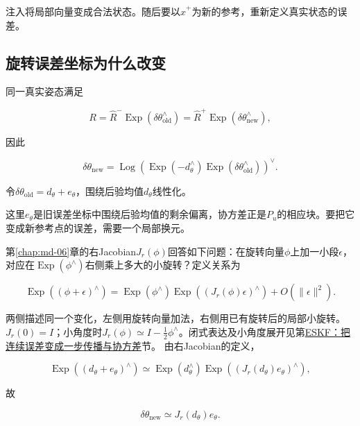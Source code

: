 注入将局部向量变成合法状态。随后要以$\hat x^+$为新的参考，重新定义真实状态的误差。

\subsection{旋转误差坐标为什么改变}

同一真实姿态满足

\begin{equation*}
R=\hat R^-\mathop{\mathrm{Exp}}(\delta\theta_{\mathrm{old}}^\wedge)
  =\hat R^+\mathop{\mathrm{Exp}}(\delta\theta_{\mathrm{new}}^\wedge),
\end{equation*}

因此

\begin{equation*}
\delta\theta_{\mathrm{new}}
 =\mathop{\mathrm{Log}}\left(\mathop{\mathrm{Exp}}(-d_\theta^\wedge)
            \mathop{\mathrm{Exp}}(\delta\theta_{\mathrm{old}}^\wedge)\right)^\vee.
\end{equation*}

令$\delta\theta_{\mathrm{old}}=d_\theta+e_\theta$，围绕后验均值$d_\theta$线性化。

这里$e_\theta$是旧误差坐标中围绕后验均值的剩余偏离，协方差正是$P_u$的相应块。要把它变成新参考点的误差，需要一个局部换元。

第\ref{chap:md-06}章的右Jacobian$J_r(\phi)$回答如下问题：在旋转向量$\phi$上加一小段$\epsilon$，对应在$\mathop{\mathrm{Exp}}(\phi^\wedge)$右侧乘上多大的小旋转？定义关系为

\begin{equation*}
\mathop{\mathrm{Exp}}((\phi+\epsilon)^\wedge)
 =\mathop{\mathrm{Exp}}(\phi^\wedge)\mathop{\mathrm{Exp}}((J_r(\phi)\epsilon)^\wedge)
   +O(\|\epsilon\|^2).
\end{equation*}

两侧描述同一个变化，左侧用旋转向量加法，右侧用已有旋转后的局部小旋转。$J_r(0)=I$；小角度时$J_r(\phi)\simeq I-\tfrac12\phi^\wedge$。闭式表达及小角度展开见第\hyperref[chap:md-09]{ESKF：把连续误差变成一步传播与协方差}节。 由右Jacobian的定义，

\begin{equation*}
\mathop{\mathrm{Exp}}((d_\theta+e_\theta)^\wedge)
 \simeq\mathop{\mathrm{Exp}}(d_\theta^\wedge)
        \mathop{\mathrm{Exp}}((J_r(d_\theta)e_\theta)^\wedge),
\end{equation*}

故

\begin{equation*}
\boxed{\delta\theta_{\mathrm{new}}\simeq J_r(d_\theta)e_\theta.}
\end{equation*}

